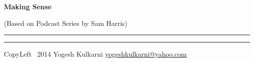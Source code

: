 % 


\usepackage{beamerarticle} %



\begin{center}
     \Large{\textbf{Making Sense}}  %
		 
		 {\tiny (Based on Podcast Series by Sam Harris)}
\end{center}
\rule{\linewidth}{0.25pt}
\raggedright
\footnotesize
\begin{multicols}{3}




\rule{0.3\linewidth}{0.25pt}

\scriptsize
CopyLeft \textcopyleft\ 2014 Yogesh Kulkarni
\href{http://www.yogeshkulkarni.com}{yogeshkulkarni@yahoo.com}

\end{multicols}

